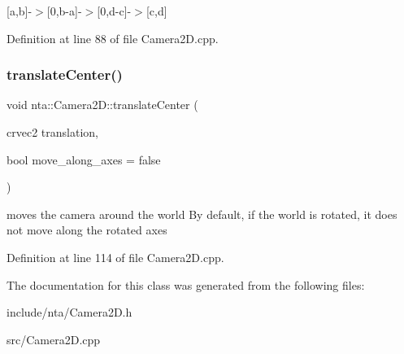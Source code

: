 \mbox{[}a,b\mbox{]}-\/$>$\mbox{[}0,b-\/a\mbox{]}-\/$>$\mbox{[}0,d-\/c\mbox{]}-\/$>$\mbox{[}c,d\mbox{]} 

Definition at line 88 of file Camera2\+D.\+cpp.

\mbox{\label{classnta_1_1Camera2D_a711b1b64b4e0bbca5c598ac15609f498}} 
\subsubsection{\texorpdfstring{translate\+Center()}{translateCenter()}}
{\footnotesize\ttfamily void nta\+::\+Camera2\+D\+::translate\+Center (\begin{DoxyParamCaption}\item[{crvec2}]{translation,  }\item[{bool}]{move\+\_\+along\+\_\+axes = {\ttfamily false} }\end{DoxyParamCaption})}

moves the camera around the world By default, if the world is rotated, it does not move along the rotated axes 

Definition at line 114 of file Camera2\+D.\+cpp.



The documentation for this class was generated from the following files\+:\begin{DoxyCompactItemize}
\item 
include/nta/Camera2\+D.\+h\item 
src/Camera2\+D.\+cpp\end{DoxyCompactItemize}
